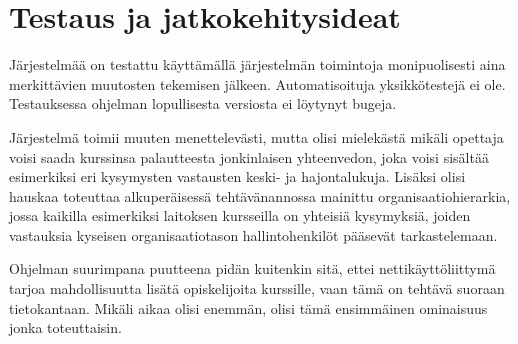 \documentclass[12pt,a4paper,titlepage]{article}
\begin{document}
\section{Testaus ja jatkokehitysideat}
Järjestelmää on testattu käyttämällä järjestelmän toimintoja monipuolisesti aina merkittävien muutosten tekemisen jälkeen. Automatisoituja yksikkötestejä ei ole. Testauksessa ohjelman lopullisesta versiosta ei löytynyt bugeja.

Järjestelmä toimii muuten menettelevästi, mutta olisi mielekästä mikäli opettaja voisi saada kurssinsa palautteesta jonkinlaisen yhteenvedon, joka voisi sisältää esimerkiksi eri kysymysten vastausten keski- ja hajontalukuja. Lisäksi olisi hauskaa toteuttaa alkuperäisessä tehtävänannossa mainittu organisaatiohierarkia, jossa kaikilla esimerkiksi laitoksen kursseilla on yhteisiä kysymyksiä, joiden vastauksia kyseisen organisaatiotason hallintohenkilöt pääsevät tarkastelemaan.

Ohjelman suurimpana puutteena pidän kuitenkin sitä, ettei nettikäyttöliittymä tarjoa mahdollisuutta lisätä opiskelijoita kurssille, vaan tämä on tehtävä suoraan tietokantaan. Mikäli aikaa olisi enemmän, olisi tämä ensimmäinen ominaisuus jonka toteuttaisin.



\small

\end{document}
